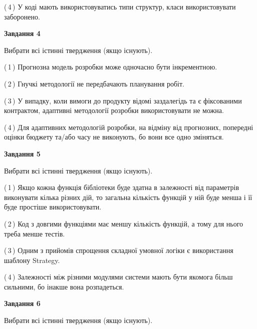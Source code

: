 \documentclass[10pt, ukrainian]{article}
\begin{document}
{\begin {large}
(\,4\,) У коді мають використовуватись типи структур, класи використовувати заборонено. %


{\begin {center}\textbf{Завдання 4}\end {center}}\par
Вибрати всі істинні твердження (якщо існують).\par
\vspace{2mm}



(\,1\,) Прогнозна модель розробки може одночасно бути інкрементною. %



(\,2\,) Гнучкі методології не передбачають планування робіт. %



(\,3\,) У випадку, коли вимоги до продукту відомі заздалегідь та є фіксованими контрактом, адаптивні методології розробки використовувати не можна. %



(\,4\,) Для адаптивних методологій розробки, на відміну від прогнозних, попередні оцінки бюджету та/або часу не виконують, бо вони все одно зміняться. %


{\begin {center}\textbf{Завдання 5}\end {center}}\par
Вибрати всі істинні твердження (якщо існують).\par
\vspace{2mm}



(\,1\,) Якщо кожна функція бібліотеки буде здатна в залежності від параметрів виконувати кілька різних дій, то загальна кількість функцій у ній буде менша і її буде простіше використовувати. %



(\,2\,) Код з довгими функціями має меншу кількість функцій, а тому для нього треба менше тестів. %



(\,3\,) Одним з прийомів спрощення складної умовної логіки є використання шаблону Strategy. %



(\,4\,) Залежності між різними модулями системи мають бути якомога більш сильними, бо інакше вона розпадеться. %

\newpage

{\begin {center}\textbf{Завдання 6}\end {center}}\par
Вибрати всі істинні твердження (якщо існують).\par
\vspace{2mm}




\end{large}}
\end{document}
